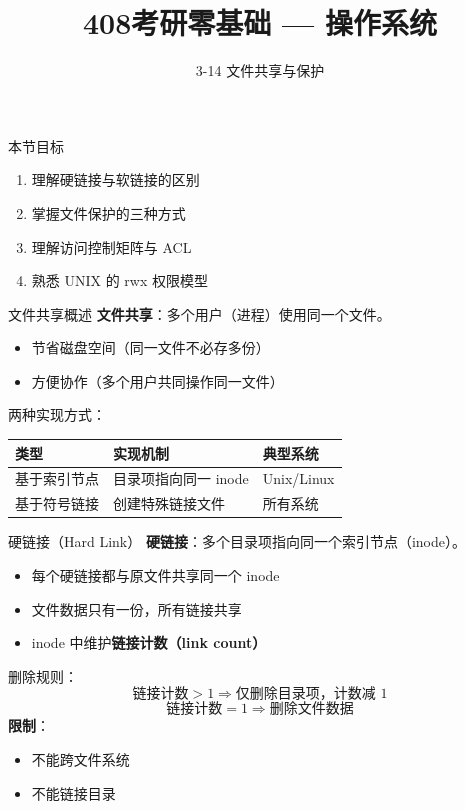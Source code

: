 \documentclass[10pt, aspectratio=169]{beamer}
\title{408考研零基础 --- 操作系统}
\subtitle{3-14 文件共享与保护}
\author{}
\date{}
\begin{document}
\begin{frame}{本节目标}
    \begin{enumerate}
        \item 理解硬链接与软链接的区别
        \item 掌握文件保护的三种方式
        \item 理解访问控制矩阵与 ACL
        \item 熟悉 UNIX 的 rwx 权限模型
    \end{enumerate}
\end{frame}

\begin{frame}{文件共享概述}
    \textbf{文件共享}：多个用户（进程）使用同一个文件。
    \vspace{0.5em}
    \begin{itemize}
        \item 节省磁盘空间（同一文件不必存多份）
        \item 方便协作（多个用户共同操作同一文件）
    \end{itemize}
    \vspace{0.5em}
    两种实现方式：
    \begin{center}
        \begin{tabular}{|l|l|l|}
            \hline
            \textbf{类型} & \textbf{实现机制} & \textbf{典型系统} \\
            \hline
            基于索引节点 & 目录项指向同一 inode & Unix/Linux \\
            基于符号链接 & 创建特殊链接文件 & 所有系统 \\
            \hline
        \end{tabular}
    \end{center}
\end{frame}

\begin{frame}{硬链接（Hard Link）}
    \textbf{硬链接}：多个目录项指向同一个索引节点（inode）。
    \vspace{0.5em}
    \begin{itemize}
        \item 每个硬链接都与原文件共享同一个 inode
        \item 文件数据只有一份，所有链接共享
        \item inode 中维护\textbf{链接计数（link count）}
    \end{itemize}
    \vspace{0.5em}
    删除规则：
    \[
    \text{链接计数} > 1 \Rightarrow \text{仅删除目录项，计数减 1}
    \]
    \[
    \text{链接计数} = 1 \Rightarrow \text{删除文件数据}
    \]
    \vspace{0.5em}
    \textbf{限制}：
    \begin{itemize}
        \item 不能跨文件系统
        \item 不能链接目录
    \end{itemize}
\end{frame}
\end{document}
